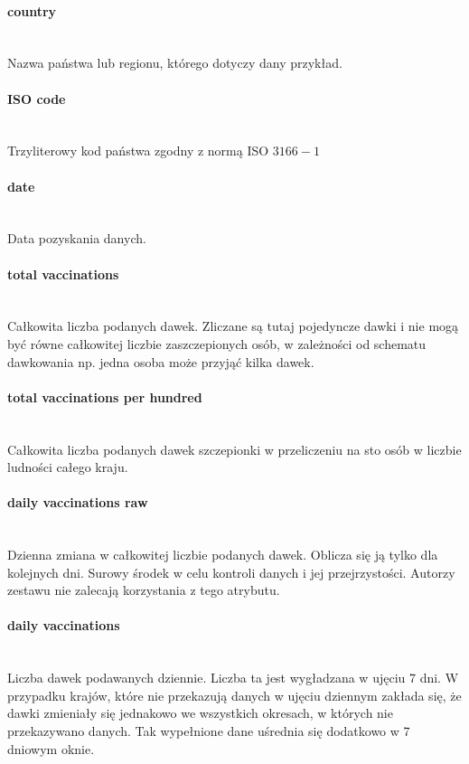 \documentclass[12pt, oneside]{article}
\begin{document}
\paragraph{country}
\mbox{}\\
Nazwa państwa lub regionu, którego dotyczy dany przykład.

\paragraph{ISO code}
\mbox{}\\
Trzyliterowy kod państwa zgodny z normą ISO $3166-1$

\paragraph{date}
\mbox{}\\
Data pozyskania danych. 

\paragraph{total vaccinations}
\mbox{}\\
Całkowita liczba podanych dawek. Zliczane są tutaj pojedyncze dawki i nie mogą być równe całkowitej liczbie zaszczepionych osób, w zależności od schematu dawkowania np. jedna osoba może przyjąć kilka dawek.

\paragraph{total vaccinations per hundred}
\mbox{}\\
Całkowita liczba podanych dawek szczepionki w przeliczeniu na sto osób w liczbie ludności całego kraju.

\paragraph{daily vaccinations raw}
\mbox{}\\
Dzienna zmiana w całkowitej liczbie podanych dawek. Oblicza się ją tylko dla kolejnych dni. Surowy środek w celu kontroli danych i jej przejrzystości. Autorzy zestawu nie zalecają korzystania z tego atrybutu. 

\paragraph{daily vaccinations}
\mbox{}\\
Liczba dawek podawanych dziennie. Liczba ta jest wygładzana w ujęciu 7 dni. W przypadku krajów, które nie przekazują danych w ujęciu dziennym zakłada się, że dawki zmieniały się jednakowo we wszystkich okresach, w których nie przekazywano danych. Tak wypełnione dane uśrednia się dodatkowo w 7 dniowym oknie.
\end{document}
